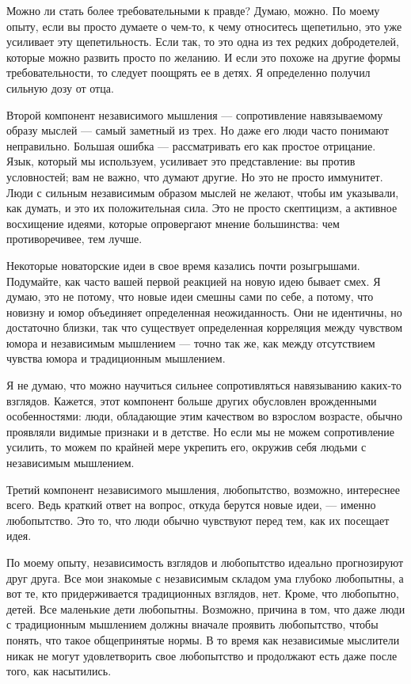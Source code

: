 \documentclass[ebook,12pt,oneside,openany]{memoir}
\begin{document}
Можно ли стать более требовательными к правде? Думаю, можно. По моему
опыту, если вы просто думаете о чем-то, к чему относитесь щепетильно,
это уже усиливает эту щепетильность. Если так, то это одна из тех
редких добродетелей, которые можно развить просто по желанию. И если
это похоже на другие формы требовательности, то следует поощрять ее в
детях. Я определенно получил сильную дозу от отца. \newline

Второй компонент независимого мышления — сопротивление навязываемому
образу мыслей — самый заметный из трех. Но даже его люди часто
понимают неправильно. Большая ошибка — рассматривать его как простое
отрицание. Язык, который мы используем, усиливает это представление:
вы против условностей; вам не важно, что думают другие. Но это не
просто иммунитет. Люди с сильным независимым образом мыслей не желают,
чтобы им указывали, как думать, и это их положительная сила. Это не
просто скептицизм, а активное восхищение идеями, которые опровергают
мнение большинства: чем противоречивее, тем лучше. \newline

Некоторые новаторские идеи в свое время казались почти розыгрышами.
Подумайте, как часто вашей первой реакцией на новую идею бывает смех.
Я думаю, это не потому, что новые идеи смешны сами по себе, а потому,
что новизну и юмор объединяет определенная неожиданность. Они не
идентичны, но достаточно близки, так что существует определенная
корреляция между чувством юмора и независимым мышлением — точно так
же, как между отсутствием чувства юмора и традиционным мышлением. \newline

Я не думаю, что можно научиться сильнее сопротивляться навязыванию
каких-то взглядов. Кажется, этот компонент больше других обусловлен
врожденными особенностями: люди, обладающие этим качеством во взрослом
возрасте, обычно проявляли видимые признаки и в детстве. Но если мы не
можем сопротивление усилить, то можем по крайней мере укрепить его,
окружив себя людьми с независимым мышлением. \newline

Третий компонент независимого мышления, любопытство, возможно,
интереснее всего. Ведь краткий ответ на вопрос, откуда берутся новые
идеи, — именно любопытство. Это то, что люди обычно чувствуют перед
тем, как их посещает идея. \newline

По моему опыту, независимость взглядов и любопытство идеально
прогнозируют друг друга. Все мои знакомые с независимым складом ума
глубоко любопытны, а вот те, кто придерживается традиционных взглядов,
нет. Кроме, что любопытно, детей. Все маленькие дети любопытны.
Возможно, причина в том, что даже люди с традиционным мышлением должны
вначале проявить любопытство, чтобы понять, что такое общепринятые
нормы. В то время как независимые мыслители никак не могут
удовлетворить свое любопытство и продолжают есть даже после того, как
насытились. \newline
\end{document}
